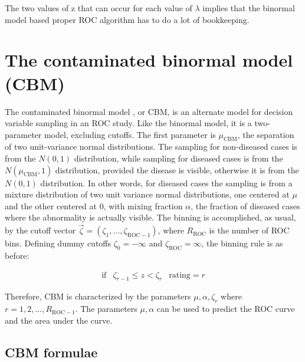 \documentclass[
]{book}
\begin{document}
The two values of z that can occur for each value of \(\lambda\) implies that the binormal model based proper ROC algorithm has to do a lot of bookkeeping.

\hypertarget{proper-roc-models-cbm}{%
\section{The contaminated binormal model (CBM)}\label{proper-roc-models-cbm}}

The contaminated binormal model \citep{dorfman2000contaminated1, dorfman2000contaminated2, dorfman2000contaminated3}, or CBM, is an alternate model for decision variable sampling in an ROC study. Like the binormal model, it is a two-parameter model, excluding cutoffs. The first parameter is \(\mu_\text{CBM}\), the separation of two unit-variance normal distributions. The sampling for non-diseased cases is from the \(N(0,1)\) distribution, while sampling for diseased cases is from the \(N(\mu_\text{CBM},1)\) distribution, provided the disease is visible, otherwise it is from the \(N(0,1)\) distribution. In other words, for diseased cases the sampling is from a mixture distribution of two unit variance normal distributions, one centered at \(\mu\) and the other centered at 0, with mixing fraction \(\alpha\), the fraction of diseased cases where the abnormality is actually visible. The binning is accomplished, as usual, by the cutoff vector \(\overrightarrow{\zeta}=\left( \zeta_1,...,\zeta_{\text{ROC}-1} \right)\), where \(R_\text{ROC}\) is the number of ROC bins. Defining dummy cutoffs \(\zeta_0=-\infty\) and \(\zeta_{\text{ROC}}=\infty\), the binning rule is as before:

\begin{equation} 
\begin{matrix}
\text{if} & \zeta_{r-1} \le z < \zeta_r & \text{rating} = r 
\end{matrix}
\end{equation}

Therefore, CBM is characterized by the parameters \(\mu, \alpha, \zeta_r\) where \(r=1,2,...,R_{\text{ROC}-1}\). The parameters \(\mu, \alpha\) can be used to predict the ROC curve and the area under the curve.

\hypertarget{proper-roc-models-cbm-formulae}{%
\subsection{CBM formulae}\label{proper-roc-models-cbm-formulae}}
\end{document}
